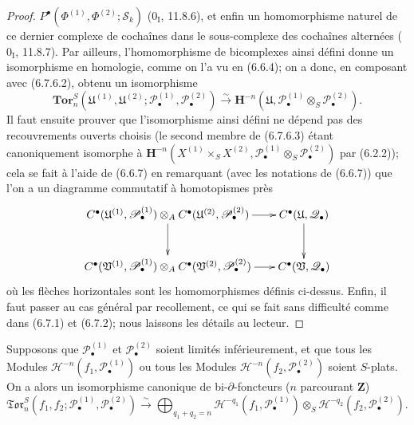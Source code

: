 \begin{proof}
$P^\bullet(\Phi^{(1)},\Phi^{(2)};\mathscr S_k)$
($0_{\mathrm I}$, 11.8.6), et enfin un homomorphisme naturel de ce dernier
complexe de cochaînes dans le sous-complexe des cochaînes alternées
($0_{\mathrm I}$, 11.8.7). Par ailleurs, l'homomorphisme de bicomplexes ainsi
défini donne un isomorphisme en homologie, comme on l'a vu en (6.6.4); on a
donc, en composant avec (6.7.6.2), obtenu un isomorphisme
\[
  \mathbf{Tor}_n^S
  (\mathfrak U^{(1)},\mathfrak U^{(2)};
   \mathscr P_\bullet^{(1)},\mathscr P_\bullet^{(2)})
  \xrightarrow{\sim}
  \mathbf H^{-n}
  (\mathfrak U,\mathscr P_\bullet^{(1)}\otimes_S\mathscr P_\bullet^{(2)}).
  \tag{6.7.6.3}\label{III.6.7.6.3.fr}
\]
Il faut ensuite prouver que l'isomorphisme ainsi défini ne dépend pas des
recouvrements ouverts choisis (le second membre de (6.7.6.3) étant
canoniquement isomorphe à
$\mathbf H^{-n}
(X^{(1)}\times_S X^{(2)},
 \mathscr P_\bullet^{(1)}\otimes_S\mathscr P_\bullet^{(2)})$ par (6.2.2));
cela se fait à l'aide de (6.6.7) en remarquant (avec les notations de (6.6.7))
que l'on a un diagramme commutatif à homotopismes près
\[
\xymatrix@C=18pt@R=28pt{
  C^\bullet(\mathfrak U^{(1)},\mathscr P_\bullet^{(1)})
  \otimes_A
  C^\bullet(\mathfrak U^{(2)},\mathscr P_\bullet^{(2)})
  \ar[r]\ar[d]
  & C^\bullet(\mathfrak U,\mathscr Q_\bullet)\ar[d]
  \\
  C^\bullet(\mathfrak V^{(1)},\mathscr P_\bullet^{(1)})
  \otimes_A
  C^\bullet(\mathfrak V^{(2)},\mathscr P_\bullet^{(2)})
  \ar[r]
  & C^\bullet(\mathfrak V,\mathscr Q_\bullet)
}
\]
où les flèches horizontales sont les homomorphismes définis ci-dessus. Enfin,
il faut passer au cas général par recollement, ce qui se fait sans difficulté
comme dans (6.7.1) et (6.7.2); nous laissons les détails au lecteur.
\end{proof}

\begin{proposition}[6.7.7]
Supposons que $\mathscr P_\bullet^{(1)}$ et
$\mathscr P_\bullet^{(2)}$ soient limités inférieurement, et que tous les
Modules $\mathscr H^{-n}(f_1,\mathscr P_\bullet^{(1)})$ ou tous les Modules
$\mathscr H^{-n}(f_2,\mathscr P_\bullet^{(2)})$ soient $S$-plats. On a alors un
isomorphisme canonique de bi-$\partial$-foncteurs ($n$ parcourant $\mathbf Z$)
\[
  \mathfrak{Tor}_n^S
  (f_1,f_2;\mathscr P_\bullet^{(1)},\mathscr P_\bullet^{(2)})
  \xrightarrow{\sim}
  \bigoplus_{q_1+q_2=n}
  \mathscr H^{-q_1}(f_1,\mathscr P_\bullet^{(1)})
  \otimes_S
  \mathscr H^{-q_2}(f_2,\mathscr P_\bullet^{(2)}).
  \tag{6.7.7.1}\label{III.6.7.7.1.fr}
\]
\end{proposition}

